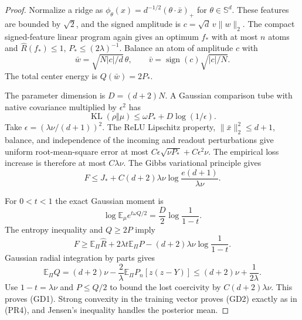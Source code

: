 \begin{proof}
Normalize a ridge as
$\phi_\theta(x)=d^{-1/2}(\theta\cdot\bar x)_+$ for
$\theta\in\mathbb S^d$. These features are bounded by $\sqrt2$,
and the signed amplitude is $c=\sqrt d\,v\|w\|_2$.
The compact signed-feature linear program again gives an optimum
$f_*$ with at most $n$ atoms and
$\widehat R(f_*)\le1$, $P_*\le(2\lambda)^{-1}$.
Balance an atom of amplitude $c$ with
\[
 \bar w=\sqrt{N|c|/d}\,\theta,
 \qquad \bar v=\operatorname{sign}(c)\sqrt{|c|/N}.
\]
The total center energy is $Q(\bar w)=2P_*$.

The parameter dimension is $D=(d+2)N$. A Gaussian comparison tube
with native covariance multiplied by $\epsilon^2$ has
\[
 \operatorname{KL}(\rho\Vert\mu)
 \le\omega P_*+D\log(1/\epsilon).
\]
Take $\epsilon=(\lambda\nu/(d+1))^2$.
The ReLU Lipschitz property, $\|\bar x\|_2^2\le d+1$, balance,
and independence of the incoming and readout perturbations give
uniform root-mean-square error at most
$C\epsilon\sqrt{\nu P_*}+C\epsilon^2\nu$.
The empirical loss increase is therefore at most $C\lambda\nu$.
The Gibbs variational principle gives
\[
 F\le J_*+C(d+2)\lambda\nu
                   \log\frac{e(d+1)}{\lambda\nu}.
\]

For $0<t<1$ the exact Gaussian moment is
\[
 \log\mathbb E_\mu e^{t\omega Q/2}
 =\frac D2\log\frac1{1-t}.
\]
The entropy inequality and $Q\ge2P$ imply
\[
 F\ge\mathbb E_\Pi\widehat R+2\lambda t\mathbb E_\Pi P
      -(d+2)\lambda\nu\log\frac1{1-t}.
\]
Gaussian radial integration by parts gives
\[
 \mathbb E_\Pi Q
 =(d+2)\nu-\frac2\lambda\mathbb E_\Pi P_n[z(z-Y)]
 \le(d+2)\nu+\frac1{2\lambda}.
\]
Use $1-t=\lambda\nu$ and $P\le Q/2$ to bound the lost coercivity
by $C(d+2)\lambda\nu$. This proves (GD1).
Strong convexity in the training vector proves (GD2) exactly as in
(PR4), and Jensen's inequality handles the posterior mean.
\end{proof}
